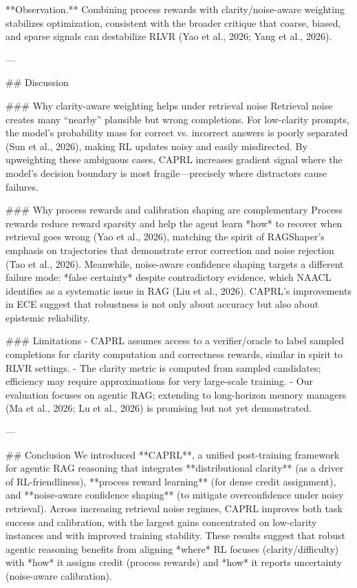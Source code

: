 **Observation.** Combining process rewards with clarity/noise-aware weighting stabilizes optimization, consistent with the broader critique that coarse, biased, and sparse signals can destabilize RLVR (Yao et al., 2026; Yang et al., 2026).

---

## Discussion  

### Why clarity-aware weighting helps under retrieval noise  
Retrieval noise creates many “nearby” plausible but wrong completions. For low-clarity prompts, the model’s probability mass for correct vs. incorrect answers is poorly separated (Sun et al., 2026), making RL updates noisy and easily misdirected. By upweighting these ambiguous cases, CAPRL increases gradient signal where the model’s decision boundary is most fragile—precisely where distractors cause failures.

### Why process rewards and calibration shaping are complementary  
Process rewards reduce reward sparsity and help the agent learn *how* to recover when retrieval goes wrong (Yao et al., 2026), matching the spirit of RAGShaper’s emphasis on trajectories that demonstrate error correction and noise rejection (Tao et al., 2026). Meanwhile, noise-aware confidence shaping targets a different failure mode: *false certainty* despite contradictory evidence, which NAACL identifies as a systematic issue in RAG (Liu et al., 2026). CAPRL’s improvements in ECE suggest that robustness is not only about accuracy but also about epistemic reliability.

### Limitations  
- CAPRL assumes access to a verifier/oracle to label sampled completions for clarity computation and correctness rewards, similar in spirit to RLVR settings.  
- The clarity metric is computed from sampled candidates; efficiency may require approximations for very large-scale training.  
- Our evaluation focuses on agentic RAG; extending to long-horizon memory managers (Ma et al., 2026; Lu et al., 2026) is promising but not yet demonstrated.

---

## Conclusion  
We introduced **CAPRL**, a unified post-training framework for agentic RAG reasoning that integrates **distributional clarity** (as a driver of RL-friendliness), **process reward learning** (for dense credit assignment), and **noise-aware confidence shaping** (to mitigate overconfidence under noisy retrieval). Across increasing retrieval noise regimes, CAPRL improves both task success and calibration, with the largest gains concentrated on low-clarity instances and with improved training stability. These results suggest that robust agentic reasoning benefits from aligning *where* RL focuses (clarity/difficulty) with *how* it assigns credit (process rewards) and *how* it reports uncertainty (noise-aware calibration).

